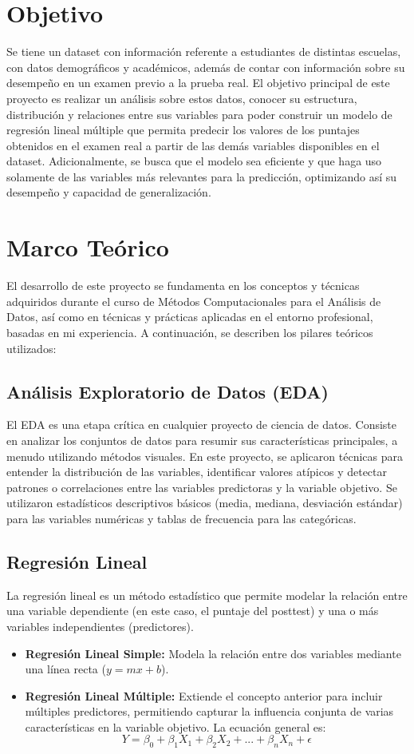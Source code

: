 \documentclass[12pt,letterpaper]{article}
\begin{document}
\section{Objetivo}
Se tiene un dataset con información referente a estudiantes de distintas escuelas, con datos demográficos y académicos, además de contar con información sobre su desempeño en un examen previo a la prueba real. El objetivo principal de este proyecto es realizar un análisis sobre estos datos, conocer su estructura, distribución y relaciones entre sus variables para poder construir un modelo de regresión lineal múltiple que permita predecir los valores de los puntajes obtenidos en el examen real a partir de las demás variables disponibles en el dataset. Adicionalmente, se busca que el modelo sea eficiente y que haga uso solamente de las variables más relevantes para la predicción, optimizando así su desempeño y capacidad de generalización. 

\section{Marco Teórico}
El desarrollo de este proyecto se fundamenta en los conceptos y técnicas adquiridos durante el curso de Métodos Computacionales para el Análisis de Datos, así como en técnicas y prácticas aplicadas en el entorno profesional, basadas en mi experiencia. A continuación, se describen los pilares teóricos utilizados:

\subsection{Análisis Exploratorio de Datos (EDA)}
El EDA es una etapa crítica en cualquier proyecto de ciencia de datos. Consiste en analizar los conjuntos de datos para resumir sus características principales, a menudo utilizando métodos visuales. En este proyecto, se aplicaron técnicas para entender la distribución de las variables, identificar valores atípicos y detectar patrones o correlaciones entre las variables predictoras y la variable objetivo. Se utilizaron estadísticos descriptivos básicos (media, mediana, desviación estándar) para las variables numéricas y tablas de frecuencia para las categóricas.

\subsection{Regresión Lineal}
La regresión lineal es un método estadístico que permite modelar la relación entre una variable dependiente (en este caso, el puntaje del posttest) y una o más variables independientes (predictores).
\begin{itemize}
    \item \textbf{Regresión Lineal Simple:} Modela la relación entre dos variables mediante una línea recta ($y = mx + b$).
    \item \textbf{Regresión Lineal Múltiple:} Extiende el concepto anterior para incluir múltiples predictores, permitiendo capturar la influencia conjunta de varias características en la variable objetivo. La ecuación general es:
    \[ Y = \beta_0 + \beta_1X_1 + \beta_2X_2 + ... + \beta_nX_n + \epsilon \]
\end{itemize}
\end{document}
